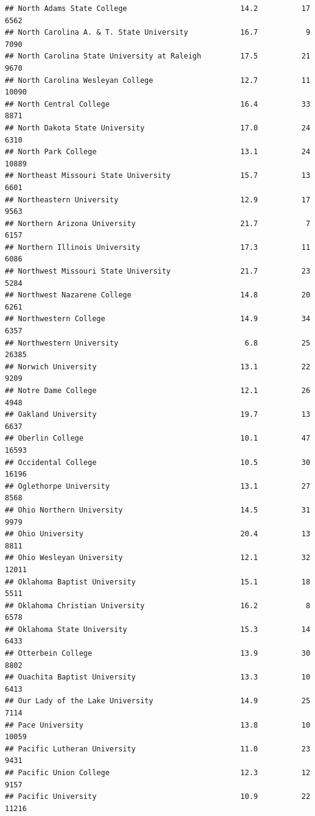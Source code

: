 \documentclass[
]{article}
\begin{document}
\begin{verbatim}
## North Adams State College                          14.2          17   6562
## North Carolina A. & T. State University            16.7           9   7090
## North Carolina State University at Raleigh         17.5          21   9670
## North Carolina Wesleyan College                    12.7          11  10090
## North Central College                              16.4          33   8871
## North Dakota State University                      17.0          24   6310
## North Park College                                 13.1          24  10889
## Northeast Missouri State University                15.7          13   6601
## Northeastern University                            12.9          17   9563
## Northern Arizona University                        21.7           7   6157
## Northern Illinois University                       17.3          11   6086
## Northwest Missouri State University                21.7          23   5284
## Northwest Nazarene College                         14.8          20   6261
## Northwestern College                               14.9          34   6357
## Northwestern University                             6.8          25  26385
## Norwich University                                 13.1          22   9209
## Notre Dame College                                 12.1          26   4948
## Oakland University                                 19.7          13   6637
## Oberlin College                                    10.1          47  16593
## Occidental College                                 10.5          30  16196
## Oglethorpe University                              13.1          27   8568
## Ohio Northern University                           14.5          31   9979
## Ohio University                                    20.4          13   8811
## Ohio Wesleyan University                           12.1          32  12011
## Oklahoma Baptist University                        15.1          18   5511
## Oklahoma Christian University                      16.2           8   6578
## Oklahoma State University                          15.3          14   6433
## Otterbein College                                  13.9          30   8802
## Ouachita Baptist University                        13.3          10   6413
## Our Lady of the Lake University                    14.9          25   7114
## Pace University                                    13.8          10  10059
## Pacific Lutheran University                        11.0          23   9431
## Pacific Union College                              12.3          12   9157
## Pacific University                                 10.9          22  11216

\end{verbatim}
\end{document}
